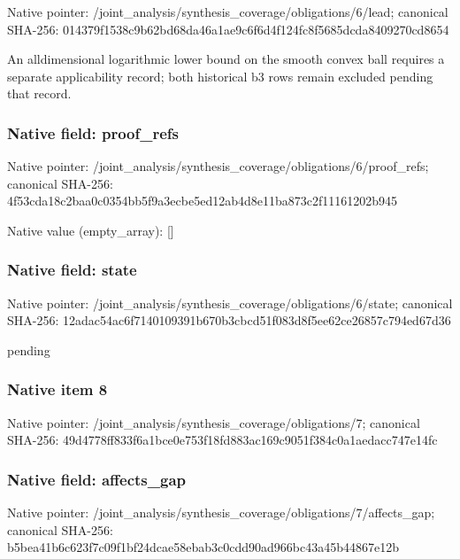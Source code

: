 \documentclass[10pt,a4paper]{article}
\begin{document}
Native pointer: /joint\_analysis/synthesi\allowbreak{}s\_coverage/obligations/6\allowbreak{}/lead; canonical SHA-256: 014379f1538c9b62bd68da46\allowbreak{}a1ae9c6f6d4f124fc8f5685d\allowbreak{}cda8409270cd8654


An alldimensional logarithmic lower bound on the smooth convex ball requires a separate applicability record; both historical b3 rows remain excluded pending that record.


\subsubsection{Native field: proof\_refs}


Native pointer: /joint\_analysis/synthesi\allowbreak{}s\_coverage/obligations/6\allowbreak{}/proof\_refs; canonical SHA-256: 4f53cda18c2baa0c0354bb5f\allowbreak{}9a3ecbe5ed12ab4d8e11ba87\allowbreak{}3c2f11161202b945



Native value (empty\_array): []



\subsubsection{Native field: state}


Native pointer: /joint\_analysis/synthesi\allowbreak{}s\_coverage/obligations/6\allowbreak{}/state; canonical SHA-256: 12adac54ac6f7140109391b6\allowbreak{}70b3cbcd51f083d8f5ee62ce\allowbreak{}26857c794ed67d36


pending


\subsubsection{Native item 8}


Native pointer: /joint\_analysis/synthesi\allowbreak{}s\_coverage/obligations/7; canonical SHA-256: 49d4778ff833f6a1bce0e753\allowbreak{}f18fd883ac169c9051f384c0\allowbreak{}a1aedacc747e14fc



\subsubsection{Native field: affects\_gap}


Native pointer: /joint\_analysis/synthesi\allowbreak{}s\_coverage/obligations/7\allowbreak{}/affects\_gap; canonical SHA-256: b5bea41b6c623f7c09f1bf24\allowbreak{}dcae58ebab3c0cdd90ad966b\allowbreak{}c43a45b44867e12b
\end{document}
